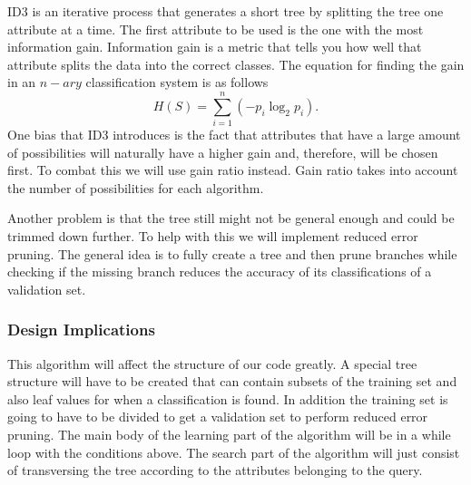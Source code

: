 \documentclass{article}
\begin{document}
				ID3 is an iterative process that generates a short tree by splitting the tree one attribute at a time. The first attribute to be used is the one with the most information gain. Information gain is  a metric that tells you how well that attribute splits the data into the correct classes. The equation for finding the gain in an $n-ary$ classification system is as follows
				\begin{equation*}
					H(S) = \sum_{i=1}^{n} \left( -p_i \log_2 p_i \right).
				\end{equation*}		
				One bias that ID3 introduces is the fact that attributes that have a large amount of possibilities will naturally have a higher gain and, therefore, will be chosen first. To combat this we will use gain ratio instead. Gain ratio takes into account the number of possibilities for each algorithm.
				
				Another problem is that the tree still might not be general enough and could be trimmed down further. To help with this we will implement reduced error pruning. The general idea is to fully create a tree and then prune branches while checking if the missing branch reduces the accuracy of its classifications of a validation set.
			\subsubsection{Design Implications}
				This algorithm will affect the structure of our code greatly. A special tree structure will have to be created that can contain subsets of the training set and also leaf values for when a classification is found. In addition the training set is going to have to be divided to get a validation set to perform reduced error pruning. The main body of the learning part of the algorithm will be in a while loop with the conditions above. The search part of the algorithm will just consist of transversing the tree according to the attributes belonging to the query.
\end{document}
